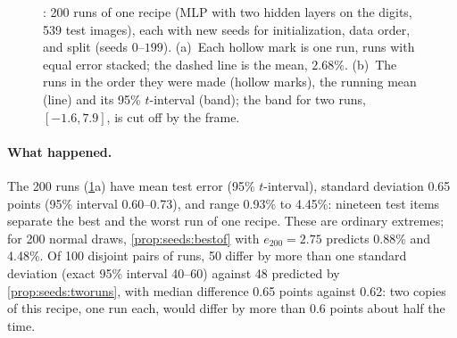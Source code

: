 \begin{refsection}
\begin{figure}[t]
\begin{fullwidth}
\centering
{}
\caption{: 200 runs of one recipe (MLP with two hidden layers on the digits, 539 test images), each with new seeds for initialization, data order, and split (seeds $0$--$199$). (a)~Each hollow mark is one run, runs with equal error stacked; the dashed line is the mean, $2.68\%$. (b)~The runs in the order they were made (hollow marks), the running mean (line) and its 95\% $t$-interval (band); the band for two runs, $[-1.6,7.9]$, is cut off by the frame.}
\label{fig:seeds:spread}
\end{fullwidth}
\end{figure}

\paragraph{What happened.} The 200 runs (\cref{fig:seeds:spread}a) have mean test error  (95\% $t$-interval), standard deviation 0.65 points (95\% interval 0.60--0.73), and range 0.93\% to 4.45\%: nineteen test items separate the best and the worst run of one recipe. These are ordinary extremes; for 200 normal draws, \cref{prop:seeds:bestof} with $e_{200}=2.75$ predicts 0.88\% and 4.48\%. Of 100 disjoint pairs of runs, 50 differ by more than one standard deviation (exact 95\% interval 40--60) against 48 predicted by \cref{prop:seeds:tworuns}, with median difference 0.65 points against 0.62: two copies of this recipe, one run each, would differ by more than 0.6 points about half the time.


\end{refsection}
